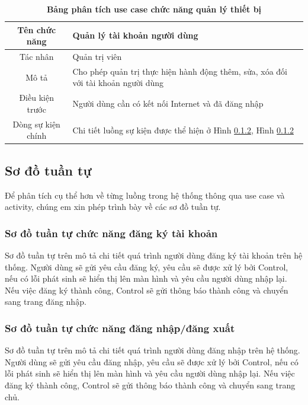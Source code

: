   \begin{table}[H]
    \caption{\bfseries \fontsize{12pt}{0pt}\selectfont Bảng phân tích use case chức năng quản lý thiết bị}
    \centering
    \begin{tabularx}{0.9\textwidth}{|c|X|}
      \hline
      \textbf{Tên chức năng} & \textbf{Quản lý tài khoản người dùng} \\
      \hline
      Tác nhân & Quản trị viên \\
      \hline
      Mô tả & Cho phép quản trị thực hiện hành động thêm, sửa, xóa đối với tài khoản người dùng \\
      \hline
      Điều kiện trước & Người dùng cần có kết nối Internet và đã đăng nhập \\
      \hline
      Dòng sự kiện chính & 
        Chi tiết luồng sự kiện được thể hiện ở Hình \ref{}, Hình \ref{} 
        \\
      \hline
    \end{tabularx}
  \end{table}

\subsection{Sơ đồ tuần tự}
Để phân tích cụ thể hơn về từng luồng trong hệ thống thông qua use case và activity, chúng em xin phép
trình bày về các sơ đồ tuần tự.

\subsubsection{Sơ đồ tuần tự chức năng đăng ký tài khoản}

Sơ đồ tuần tự trên mô tả chi tiết quá trình người dùng đăng ký tài khoản trên hệ thống. Người dùng sẽ gửi yêu cầu đăng ký, yêu cầu sẽ được xử lý
bởi Control, nếu có lỗi phát sinh sẽ hiển thị lên màn hình và yêu cầu người dùng nhập lại. Nếu việc đăng ký thành công, Control sẽ gửi thông báo 
thành công và chuyển sang trang đăng nhập.  

\subsubsection{Sơ đồ tuần tự chức năng đăng nhập/đăng xuất}

Sơ đồ tuần tự trên mô tả chi tiết quá trình người dùng đăng nhập trên hệ thống. Người dùng sẽ gửi yêu cầu đăng nhập, yêu cầu sẽ được xử lý
bởi Control, nếu có lỗi phát sinh sẽ hiển thị lên màn hình và yêu cầu người dùng nhập lại. Nếu việc đăng ký thành công, Control sẽ gửi thông báo 
thành công và chuyển sang trang chủ. 

